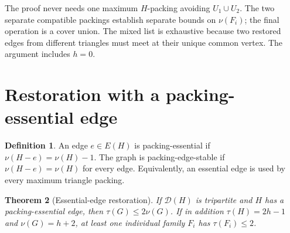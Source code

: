 \documentclass[11pt]{article}
\newtheorem{theorem}{Theorem}[section]
\theoremstyle{definition}\newtheorem{definition}[theorem]{Definition}
\theoremstyle{remark}\newtheorem{remark}[theorem]{Remark}
\newcommand{\D}{\mathcal D}
\begin{document}
The proof never needs one maximum \(H\)-packing avoiding \(U_1 \cup U_2\). The two separate compatible packings establish separate bounds on \(\nu(F_i)\); the final operation is a cover union. The mixed list is exhaustive because two restored edges from different triangles must meet at their unique common vertex. The argument includes \(h=0\).

\section{Restoration with a packing-essential edge}\label{sec:essential}
\begin{definition}
An edge $e\in E(H)$ is packing-essential if $\nu(H-e)=\nu(H)-1$. The graph is packing-edge-stable if $\nu(H-e)=\nu(H)$ for every edge. Equivalently, an essential edge is used by every maximum triangle packing.
\end{definition}
\begin{theorem}[Essential-edge restoration]\label{thm:essential}
If $\D(H)$ is tripartite and $H$ has a packing-essential edge, then $\tau(G)\le2\nu(G)$. If in addition $\tau(H)=2h-1$ and $\nu(G)=h+2$, at least one individual family $F_i$ has $\tau(F_i)\le2$.
\end{theorem}
\end{document}
